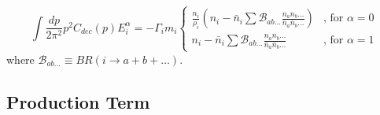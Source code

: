 \documentclass[preprint,notoc]{JHEP3}
\def\to{\rightarrow}
\def\to{\rightarrow}
\begin{document}
\begin{equation}
\int \frac{dp}{2 \pi^2} p^2 C_{dec}(p) E_i^{\alpha} = 
 -\Gamma_i  m_i \left\{ \begin{array}{ll}\frac{n_i}{\rho_i}\left( n_i -
 \bar{n}_i \sum \mathcal{B}_{ab\ldots}
 \frac{n_a n_b \ldots}{\bar{n}_a \bar{n}_b \ldots} \right)   &
 \mbox{, for $\alpha = 0$}
 \\
 n_i - \bar{n}_i \sum \mathcal{B}_{ab\ldots}
 \frac{n_a n_b \ldots}{\bar{n}_a \bar{n}_b \ldots}  & \mbox{, for $\alpha = 1$}
\end{array} \right. \label{eq:decfin}
\end{equation}
where $\mathcal{B}_{ab\ldots} \equiv BR(i\to a+b+\ldots)$.



\subsection{Production Term}
\end{document}
